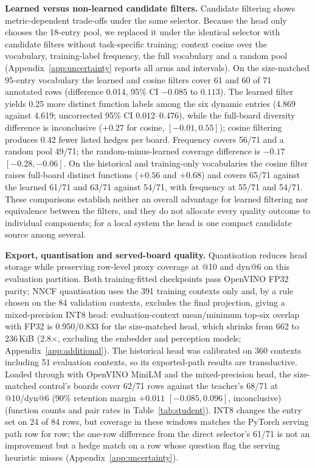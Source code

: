\textbf{Learned versus non-learned candidate filters.} Candidate filtering shows metric-dependent trade-offs under the same selector. Because the head only chooses the 18-entry pool, we replaced it under the identical selector with candidate filters without task-specific training: context cosine over the vocabulary, training-label frequency, the full vocabulary and a random pool (Appendix~\ref{app:uncertainty} reports all arms and intervals). On the size-matched 95-entry vocabulary the learned and cosine filters cover 61 and 60 of 71 annotated rows (difference 0.014, 95\% CI $-0.085$ to $0.113$). The learned filter yields 0.25 more distinct function labels among the six dynamic entries (4.869 against 4.619; uncorrected 95\% CI 0.012--0.476), while the full-board diversity difference is inconclusive ($+0.27$ for cosine, $[-0.01,0.55]$); cosine filtering produces 0.42 fewer listed hedges per board. Frequency covers 56/71 and a random pool 49/71; the random-minus-learned coverage difference is $-0.17$ $[-0.28,-0.06]$. %
On the historical and training-only vocabularies the cosine filter raises full-board distinct functions ($+0.56$ and $+0.68$) and covers 65/71 against the learned 61/71 and 63/71 against 54/71, with frequency at 55/71 and 54/71. %
These comparisons establish neither an overall advantage for learned filtering nor equivalence between the filters, and they do not allocate every quality outcome to individual components; for a local system the head is one compact candidate source among several. %

\textbf{Export, quantisation and served-board quality.} Quantisation reduces head storage while preserving row-level proxy coverage at @10 and dyn@6 on this evaluation partition. Both training-fitted checkpoints pass OpenVINO FP32 parity; NNCF quantisation \citep{nncf} uses the 391 training contexts only and, by a rule chosen on the 84 validation contexts, excludes the final projection, giving a mixed-precision INT8 head: evaluation-context mean/minimum top-six overlap with FP32 is 0.950/0.833 for the size-matched head, which shrinks from 662 to 236\,KiB (2.8$\times$, excluding the embedder and perception models; Appendix~\ref{app:additional}). The historical head was calibrated on 360 contexts including 51 evaluation contexts, so its exported-path results are transductive. %
Loaded through  with OpenVINO MiniLM and the mixed-precision head, the size-matched control's boards cover 62/71 rows against the teacher's 68/71 at @10/dyn@6 (90\% retention margin $+0.011$ $[-0.085,0.096]$, inconclusive) (function counts and pair rates in Table~\ref{tab:student}). INT8 changes the entry set on 24 of 84 rows, but coverage in these windows matches the PyTorch serving path row for row; the one-row difference from the direct selector's 61/71 is not an improvement but a hedge match on a row whose question flag the serving heuristic misses (Appendix~\ref{app:uncertainty}). %

